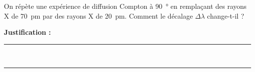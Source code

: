 On répète une expérience de diffusion Compton à \qty{90}{\degree} en remplaçant des rayons X de \qty{70}{pm} par des rayons X de \qty{20}{pm}. Comment le décalage $\Delta\lambda$ change-t-il ?

\choices

\noindent\textbf{Justification :} \hrulefill \\[2.5ex]
\rule{\linewidth}{0.4pt} \\[2.5ex]
\rule{\linewidth}{0.4pt}
\vfill
